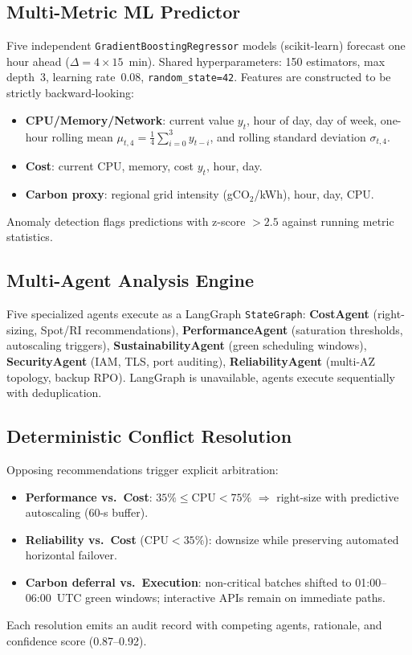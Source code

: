 \documentclass[conference]{IEEEtran}
\begin{document}
\subsection{Multi-Metric ML Predictor}
Five independent \texttt{GradientBoostingRegressor} models (scikit-learn)
forecast one hour ahead ($\Delta=4\times15$~min). Shared hyperparameters:
150 estimators, max depth~3, learning rate~0.08, \texttt{random\_state=42}.
Features are constructed to be strictly backward-looking:

\begin{itemize}
  \item \textbf{CPU/Memory/Network}: current value $y_t$, hour of day,
        day of week, one-hour rolling mean
        $\mu_{t,4}=\tfrac{1}{4}\sum_{i=0}^{3}y_{t-i}$, and rolling
        standard deviation $\sigma_{t,4}$.
  \item \textbf{Cost}: current CPU, memory, cost $y_t$, hour, day.
  \item \textbf{Carbon proxy}: regional grid intensity
        (gCO$_2$/kWh), hour, day, CPU.
\end{itemize}

Anomaly detection flags predictions with z-score $>2.5$ against running
metric statistics.

\subsection{Multi-Agent Analysis Engine}
Five specialized agents execute as a LangGraph \texttt{StateGraph}:
\textbf{CostAgent} (right-sizing, Spot/RI recommendations),
\textbf{PerformanceAgent} (saturation thresholds, autoscaling triggers),
\textbf{SustainabilityAgent} (green scheduling windows),
\textbf{SecurityAgent} (IAM, TLS, port auditing),
\textbf{ReliabilityAgent} (multi-AZ topology, backup RPO).
LangGraph is unavailable, agents execute sequentially with deduplication.

\subsection{Deterministic Conflict Resolution}
Opposing recommendations trigger explicit arbitration:
\begin{itemize}
  \item \textbf{Performance vs.\ Cost}: $35\%\!\le\!$CPU$\!<\!75\%$
        $\Rightarrow$ right-size with predictive autoscaling (60-s buffer).
  \item \textbf{Reliability vs.\ Cost} ($\text{CPU}<35\%$): downsize
        while preserving automated horizontal failover.
  \item \textbf{Carbon deferral vs.\ Execution}: non-critical batches
        shifted to 01:00--06:00~UTC green windows; interactive APIs
        remain on immediate paths.
\end{itemize}
Each resolution emits an audit record with competing agents, rationale,
and confidence score (0.87--0.92).
\end{document}
